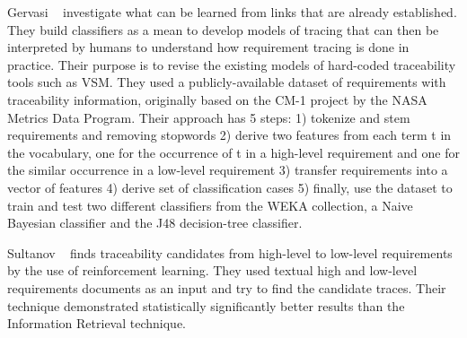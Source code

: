 Gervasi \etal~\cite{Gervasi:2011} investigate what can be learned from links
that are already established. They build classifiers as a mean to develop models
of tracing that can then be interpreted by humans to understand how requirement
tracing is done in practice. Their purpose is to revise the existing models of
hard-coded traceability tools such as VSM.
They used a publicly-available dataset of requirements with traceability
information, originally based on the CM-1 project by the NASA Metrics Data
Program. Their approach has 5 steps: 1) tokenize and stem requirements and
removing stopwords 2) derive two features from each term t in the vocabulary,
one for the occurrence of t in a high-level requirement and one for the similar
occurrence in a low-level requirement 3) transfer requirements into a vector of
features 4) derive set of classification cases 5)
finally, use the dataset to train and test two different classifiers from the WEKA collection, a Naive
Bayesian classifier and the J48 decision-tree classifier.\newline

Sultanov \etal~\cite{Sultanov:2013} finds traceability candidates from
high-level to low-level requirements by the use of reinforcement
learning.
They used textual high and low-level requirements documents as an input and try to
find the candidate traces. Their technique demonstrated statistically
significantly better results than the Information Retrieval technique.





